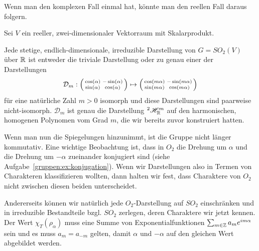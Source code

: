 \begin{remark}
Wenn man den komplexen Fall einmal hat, könnte man den reellen Fall daraus folgern.
\end{remark}

\begin{corollary}[Darstellungstheorie von $SO_2$ über $\IK=\IR$]
Sei $V$ ein reeller, zwei-dimensionaler Vektorraum mit Skalarprodukt.

Jede stetige, endlich-dimensionale, irreduzible Darstellung von $G=SO_2(V)$ über $\mathbb{R}$ ist entweder die triviale Darstellung oder zu genau einer der Darstellungen
\[\mathcal{D}_m : \begin{psmallmatrix}\cos(\alpha)&-\sin(\alpha)\\\sin(\alpha)&\cos(\alpha)\end{psmallmatrix} \mapsto \begin{psmallmatrix}\cos(m\alpha)&-\sin(m\alpha)\\\sin(m\alpha)&\cos(m\alpha)\end{psmallmatrix}\]
für eine natürliche Zahl $m>0$ isomorph und diese Darstellungen sind paarweise nicht-isomorph. $\mathcal{D}_m$ ist genau die Darstellung ${^2}\mathscr{H}_{\mathbb{R}}^m$ auf den harmonischen, homogenen Polynomen vom Grad $m$, die wir bereits zuvor konstruiert hatten.
\end{corollary}

\begin{remark}
Wenn man nun die Spiegelungen hinzunimmt, ist die Gruppe nicht länger kommutativ. Eine wichtige Beobachtung ist, dass in $O_2$ die Drehung um $\alpha$ und die Drehung um $-\alpha$ zueinander konjugiert sind (siehe Aufgabe~\ref{gruppen:ex:konjugation}). Wenn wir Darstellungen also in Termen von Charakteren klassifizieren wollten, dann halten wir fest, dass Charaktere von $O_2$ nicht zwischen diesen beiden unterscheidet.

Andererseits können wir natürlich jede $O_2$-Darstellung auf $SO_2$ einschränken und in irreduzible Bestandteile bzgl. $SO_2$ zerlegen, deren Charaktere wir jetzt kennen. Der Wert $\chi_T(\rho_\alpha)$ muss eine Summe von Exponentialfunktionen $\sum_{m\in\mathbb{Z}} a_m e^{im\alpha}$ sein und es muss $a_m=a_{-m}$ gelten, damit $\alpha$ und $-\alpha$ auf den gleichen Wert abgebildet werden.
\end{remark}

